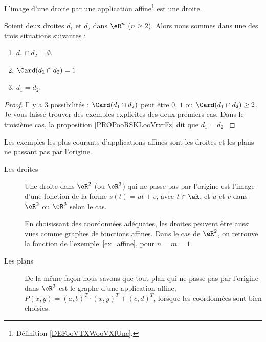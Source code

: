 \begin{proposition}     \label{PROPooNTHVooWWyafJ}
	L'image d'une droite par une application affine\footnote{Définition \ref{DEFooVTXWooVXfUnc}.} est une droite.
\end{proposition}


\begin{proposition}     \label{PROPooTFTJooJejuBU}
	Soient deux droites \( d_1\) et \( d_2\) dans \( \eR^n\) (\( n\geq 2\)). Alors nous sommes dans une des trois situations suivantes :
	\begin{enumerate}
		\item
		      \( d_1\cap d_2=\emptyset\).
		\item
		      \( \Card(d_1\cap d_2)=1\)
		\item
		      \( d_1=d_2\).
	\end{enumerate}
\end{proposition}

\begin{proof}
	Il y a \( 3\) possibilités : \( \Card(d_1\cap d_2)\) peut être \( 0\), \( 1\) ou \( \Card(d_1\cap d_2)\geq 2\). Je vous laisse trouver des exemples explicites des deux premiers cas. Dans le troisième cas, la proposition \ref{PROPooRSKLooVrxrFz} dit que \( d_1=d_2\).
\end{proof}

\begin{example}
	Les exemples les plus courants d'applications affines sont les droites et les plans ne passant pas par l'origine.
	\begin{description}
		\item[Les droites] Une droite dans \( \eR^2\) (ou \( \eR^3\)) qui ne passe pas par l'origine est l'image d'une fonction de la forme \( s(t) =u t +v\), avec \( t \in \eR\), et \( u\) et \( v\) dans \( \eR^2\) ou \( \eR^3\) selon le cas.

			En choisissant des coordonnées adéquates, les droites peuvent être aussi vues comme graphes de fonctions affines. Dans le cas de \( \eR^2\), on retrouve la fonction de l'exemple~\ref{ex_affine}, pour \( n = m = 1 \).

		\item[Les plans]
			De la même façon nous savons que tout plan qui ne passe pas par l'origine dans \( \eR^3\) est le graphe d'une application affine, \( P(x,y)= (a,b)^T\cdot(x,y)^T+(c,d)^T\), lorsque les coordonnées sont bien choisies.
	\end{description}
\end{example}


